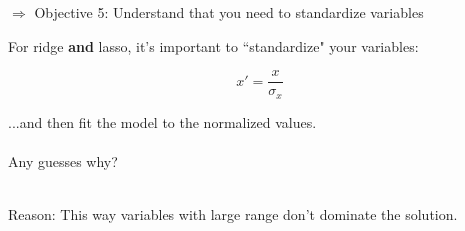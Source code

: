 \documentclass[mathserif, handout, aspectratio=169]{beamer}
\begin{document}
\begin{frame}{$\Rightarrow$ Objective 5: Understand that you need to standardize variables}

For ridge \textbf{and} lasso, it's important to ``standardize" your variables:

\begin{equation}
x' = \frac{x}{\sigma_x}
\end{equation}

...and then fit the model to the normalized values.  \\~\\

Any guesses why?\\~\\

\pause

Reason: This way variables with large range don't dominate the solution.  

\end{frame}
\end{document}
